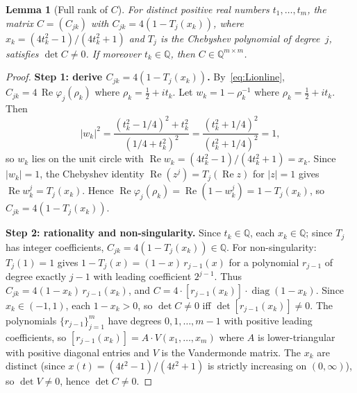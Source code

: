 \documentclass[12pt]{amsart}
\theoremstyle{definition}
\theoremstyle{remark}
\theoremstyle{plain}
\newtheorem{lemma}[definition]{Lemma}
\newcommand{\re}{\operatorname{Re}}
\newcommand{\QQ}{\mathbb{Q}}
\begin{document}
\begin{lemma}[Full rank of $C$]
\label{lem:Crank}
For distinct positive real numbers $t_1, \ldots, t_m$, the matrix
$C = (C_{jk})$ with $C_{jk} = 4(1 - T_j(x_k))$,
where $x_k = (4t_k^2-1)/(4t_k^2+1)$ and $T_j$ is the
Chebyshev polynomial of degree~$j$, satisfies $\det C \neq 0$.
If moreover $t_k \in \QQ$, then $C \in \QQ^{m\times m}$.
\end{lemma}

\begin{proof}
\textbf{Step 1: derive $C_{jk} = 4(1-T_j(x_k))$.}
By~\eqref{eq:Lionline}, $C_{jk} = 4\,\re\varphi_j(\rho_k)$ where $\rho_k = \tfrac12+it_k$.
Let $w_k = 1 - \rho_k^{-1}$ where $\rho_k = \tfrac12 + it_k$.
Then
\[
  |w_k|^2 = \frac{(t_k^2 - 1/4)^2 + t_k^2}{(1/4+t_k^2)^2}
           = \frac{(t_k^2+1/4)^2}{(t_k^2+1/4)^2} = 1,
\]
so $w_k$ lies on the unit circle with $\re w_k = (4t_k^2-1)/(4t_k^2+1) = x_k$.
Since $|w_k|=1$, the Chebyshev identity $\re(z^j)=T_j(\re z)$ for $|z|=1$ gives
$\re w_k^j = T_j(x_k)$.  Hence
$\re\varphi_j(\rho_k) = \re(1-w_k^j) = 1-T_j(x_k)$,
so $C_{jk} = 4(1-T_j(x_k))$.

\textbf{Step 2: rationality and non-singularity.}
Since $t_k \in \QQ$, each $x_k \in \QQ$; since $T_j$ has integer
coefficients, $C_{jk} = 4(1-T_j(x_k)) \in \QQ$.  For non-singularity:
$T_j(1) = 1$ gives $1 - T_j(x) = (1-x)\,r_{j-1}(x)$ for a polynomial $r_{j-1}$
of degree exactly $j-1$ with leading coefficient $2^{j-1}$.  Thus
$C_{jk} = 4(1-x_k)\,r_{j-1}(x_k)$,
and $C = 4 \cdot [r_{j-1}(x_k)] \cdot \operatorname{diag}(1-x_k)$.
Since $x_k \in (-1,1)$, each $1-x_k > 0$, so $\det C \neq 0$ iff
$\det[r_{j-1}(x_k)] \neq 0$.  The polynomials $\{r_{j-1}\}_{j=1}^m$ have
degrees $0,1,\ldots,m-1$ with positive leading coefficients, so
$[r_{j-1}(x_k)] = A \cdot V(x_1, \ldots, x_m)$ where $A$ is lower-triangular
with positive diagonal entries and $V$ is the Vandermonde matrix.
The $x_k$ are distinct (since $x(t)=(4t^2-1)/(4t^2+1)$ is strictly
increasing on $(0,\infty)$), so $\det V \neq 0$, hence $\det C \neq 0$.
\end{proof}
\end{document}
